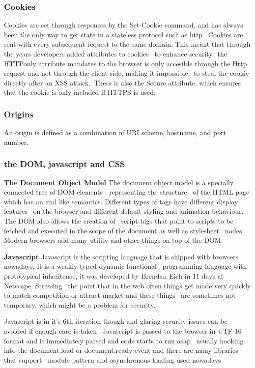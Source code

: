 \documentclass[a4paper,12pt]{paper}
\begin{document}
\subsubsection{Cookies}
\label{cookie}
Cookies are set through responses by the Set-Cookie command, and has always been the only way to get state in a stateless protocol such as http \
Cookies are sent with every subsequent request to the same domain. This meant that through the years developers added attributes to cookies \
to enhance security.\
the HTTPonly attribute mandates to the browser is only accesible through the Http request and not through the client side, making it impossible \
to steal the cookie directly after an XSS attack.\
There is also the Secure attribute, which ensures that the cookie is only included if HTTPS is used.

\subsubsection{Origins}

An origin is defined as a combination of URI scheme, hostname, and port number.

\subsubsection{the DOM, javascript and CSS}

\textbf{The Document Object Model}
The document object model is a specially connected tree of DOM elements , representing the structure \
of the HTML page which has an xml like semantics. Different types of tags have different display features \
on the browser and different default styling and animation behaviour. The DOM also allows the creation of \
script tags that point to scripts to be fetched and executed in the scope of the document as well as stylesheet \
nodes. Modern browsers add many utility and other things on top of the DOM.

\textbf{Javascript}
Javascript is the scripting language that is shipped with browsers nowadays, It is a weakly typed dynamic functional \
programming language with prototypical inheritence, it was developed by Brendan Eich in 11 days at Netscape. Stressing \
the point that in the web often things get made very quickly to match competition or attract market and these things \
are sometimes not temporary. which might be a problem for security.

Javascript is in it's 6th iteration though and glaring security issues can be avoided if enough care is taken \
Javascript is passed to the browser in UTF-16 format and is immediately parsed and code starts to run asap \ 
usually hooking into the document.load or document.ready event and there are many libraries that support \
module pattern and asynchronous loading used nowadays\\
\end{document}
